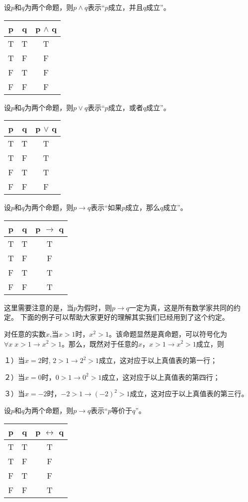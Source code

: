\documentclass{article}
\begin{document}
\begin{CJK}{UTF8}{gbsn}
  设$p$和$q$为两个命题，则$p\land q$表示“$p$成立，并且$q$成立”。
  
  \begin{tabular}{cc|c}
    p& q& p $\land$ q\\
    \hline
    T&T&T\\
    T&F&F\\
    F&T&F\\
    F&F&F\\
  \end{tabular}

  设$p$和$q$为两个命题，则$p\lor q$表示“$p$成立，或者$q$成立”。
  
  \begin{tabular}{cc|c}
    p& q& p $\lor$ q\\
    \hline
    T&T&T\\
    T&F&T\\
    F&T&T\\
    F&F&F\\
  \end{tabular}

设$p$和$q$为两个命题，则$p\to q$表示“如果$p$成立，那么$q$成立”。  

    \begin{tabular}{cc|c}
    p& q& p $\to$ q\\
    \hline
    T&T&T\\
    T&F&F\\
    F&T&T\\
    F&F&T\\
    \end{tabular}\hspace{0.87cm}

    这里需要注意的是，当$p$为假时，则$p\to q$一定为真，这是所有数学家共同的约定。
    下面的例子可以帮助大家更好的理解其实我们已经用到了这个约定。

    对任意的实数$x$,当$x>1$时，$x^2 > 1$。该命题显然是真命题，可以符号化为$\forall x \; x > 1 \to x^2 > 1$。那么，既然对于任意的$x$，$x>1 \to x^2>1$成立，则

    １）当$x=2$时, $2 > 1 \to 2^2 >1$成立，这对应于以上真值表的第一行；

    ２）当$x=0$时，$0 > 1 \to 0^2 > 1$成立，这对应于以上真值表的第四行；

    ３）当$x=-2$时，$-2>1 \to (-2)^2 > 1$成立，这对应于以上真值表的第三行。
    
设$p$和$q$为两个命题，则$p\to q$表示“$p$等价于$q$”。  

  \begin{tabular}{cc|c}
    p& q& p $\leftrightarrow$ q\\
    \hline
    T&T&T\\
    T&F&F\\
    F&T&F\\
    F&F&T\\
  \end{tabular}


\end{CJK}
\end{document}
